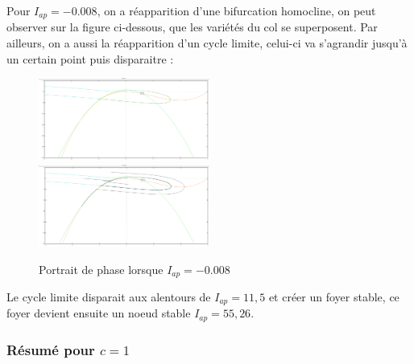 \documentclass[12pt,a4paper,onecolumn]{article}
\begin{document}
Pour $I_{ap} = -0.008$, on a réapparition d'une bifurcation homocline, on peut observer sur la figure ci-dessous, que les variétés du col se superposent. Par ailleurs, on a aussi la réapparition d'un cycle limite, celui-ci va s'agrandir jusqu'à un certain point puis disparaitre  :
\begin{figure}[H]
	\centering
	\includegraphics[width=0.5\textwidth]{I-0_008bis.png}
	\includegraphics[width=0.5\textwidth]{I-0_008.png}
	\caption{Portrait de phase lorsque $I_{ap} = -0.008$ }
\end{figure}

Le cycle limite disparait aux alentours de  $I_{ap}=11,5$ et créer un foyer stable, ce foyer devient ensuite un noeud stable $I_{ap}=55,26$.

\subsubsection{Résumé pour $c=1$}
\end{document}
